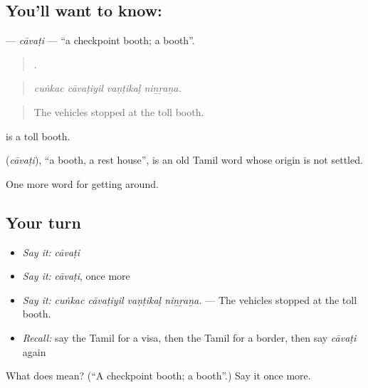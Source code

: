 \subsection*{You'll want to know: }
\textbf{} — \emph{cāvaṭi} — \textquotedblleft{}a checkpoint booth; a booth\textquotedblright{}.

\begin{quote}
   .
\end{quote}

\begin{quote}
\emph{cuṅkac cāvaṭiyil vaṇṭikaḷ niṉṟaṉa.}
\end{quote}

\begin{quote}
The vehicles stopped at the toll booth.
\end{quote}

  is a toll booth.

\begin{cousinweb}
\textbf{} (\emph{cāvaṭi}), \textquotedblleft{}a booth, a rest house\textquotedblright{}, is an old Tamil word whose origin is not settled.
\end{cousinweb}

\begin{grammarlens}[title={What you've built}]
One more word for getting around.
\end{grammarlens}

\subsection*{Your turn}
\begin{itemize}
\raggedright
  \item \emph{Say it:} \emph{cāvaṭi}
  \item \emph{Say it:} \emph{cāvaṭi}, once more
  \item \emph{Say it:} \emph{cuṅkac cāvaṭiyil vaṇṭikaḷ niṉṟaṉa.} — The vehicles stopped at the toll booth.
  \item \emph{Recall:} say the Tamil for a visa, then the Tamil for a border, then say \emph{cāvaṭi} again
\end{itemize}

\begin{tcolorbox}[breakable,colback=teal!4,colframe=teal!35!black,title={Before you move on}]
What does  mean? (\textquotedblleft{}A checkpoint booth; a booth\textquotedblright{}.) Say it once more.
\end{tcolorbox}
